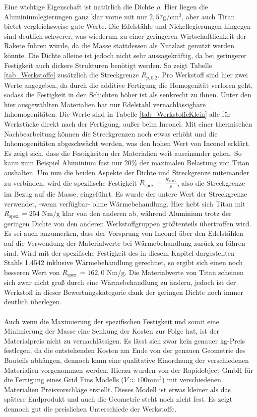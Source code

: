 Eine wichtige Eigenschaft ist natürlich die Dichte $\rho$. Hier liegen die Aluminiumlegierungen ganz klar vorne mit nur $2,57$g/cm$^3$, aber auch Titan bietet vergleichsweise gute Werte. Die Edelstähle und Nickellegierungen hingegen sind deutlich schwerer, was wiederum zu einer geringeren Wirtschaftlichkeit der Rakete führen würde, da die Masse stattdessen als Nutzlast genutzt werden könnte. Die Dichte alleine ist jedoch nicht sehr aussagekräftig, da bei geringerer Festigkeit auch dickere Strukturen benötigt werden. So zeigt Tabelle \ref{tab_Werkstoffe} zusätzlich die Streckgrenze $R_{p,0.2}$. Pro Werkstoff sind hier zwei Werte angegeben, da durch die additive Fertigung die Homogenität verloren geht, sodass die Festigkeit in den Schichten höher ist als senkrecht zu ihnen. Unter den hier ausgewählten Materialien hat nur Edelstahl vernachlässigbare Inhomogenitäten. Die Werte sind in Tabelle \ref{tab_WerkstoffeKlein} alle für Werkstücke direkt nach der Fertigung, außer beim Inconel. Mit einer thermischen Nachbearbeitung können die Streckgrenzen noch etwas erhöht und die Inhomogenitäten abgeschwächt werden, was den hohen Wert von Inconel erklärt. Es zeigt sich, dass die Festigkeiten der Materialien weit auseinander gehen. So kann zum Beispiel Aluminium fast nur 20\% der maximalen Belastung von Titan aushalten. Um nun die beiden Aspekte der Dichte und Streckgrenze miteinander zu verbinden, wird die spezifische Festigkeit $R_\mathrm{spez.}=\frac{R_{p,0.2}}{\rho}$, also die Streckgrenze im Bezug auf die Masse, eingeführt. Es wurde der untere Wert der Streckgrenze verwendet, -wenn verfügbar- ohne Wärmebehandlung. Hier hebt sich Titan mit $R_\mathrm{spez.}=254$ Nm/g klar von den anderen ab, während Aluminium trotz der geringen Dichte von den anderen Werkstoffgruppen größtenteils übertroffen wird. Es sei auch anzumerken, dass der Vorsprung von Inconel über den Edelstählen auf die Verwendung der Materialwerte bei Wärmebehandlung zurück zu führen sind. Wird mit der spezifische Festigkeit des in diesem Kapitel dargestellten Stahls 1.4542 inklusive Wärmebehandlung gerechnet, so ergibt sich einen noch besseren Wert von $R_\mathrm{spez.} = 162,0$ Nm/g. Die Materialwerte von Titan scheinen sich zwar nicht groß durch eine Wärmebehandlung zu ändern, jedoch ist der Werkstoff in dieser Bewertungskategorie dank der geringen Dichte noch immer deutlich überlegen.
\\~\\
Auch wenn die Maximierung der spezifischen Festigkeit und somit eine Minimierung der Masse eine Senkung der Kosten zur Folge hat, ist der Materialpreis nicht zu vernachlässigen. Es lässt sich zwar kein genauer kg-Preis festlegen, da die entstehenden Kosten am Ende von der genauen Geometrie des Bauteils abhängen, dennoch kann eine qualitative Einordnung der verschiedenen Materialien vorgenommen werden. Hierzu wurden von der Rapidobject GmbH für die Fertigung eines Grid Fins Modells ($V \approx 100\mathrm{mm}^3$) mit verschiedenen Materialien Preisvorschläge erstellt. Dieses Modell ist etwas kleiner als das spätere Endprodukt und auch die Geometrie steht noch nicht fest. Es zeigt dennoch gut die preislichen Unterschiede der Werkstoffe.
